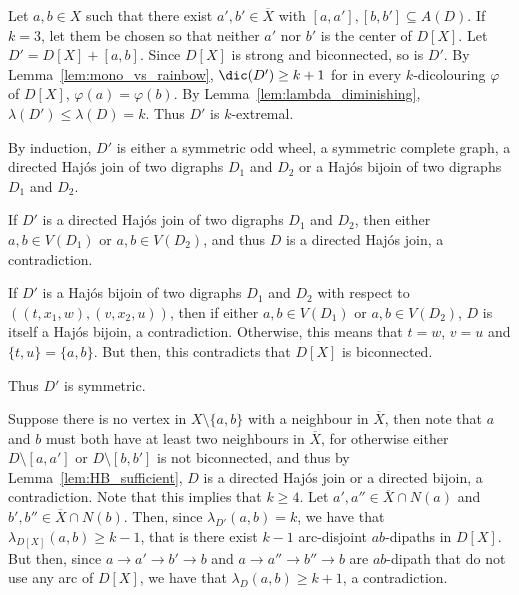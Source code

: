 


   

    Let $a, b \in X$ such that there exist $a',b' \in \overline{X}$ with $[a,a'], [b,b'] \subseteq A(D)$. If $k=3$, let them be chosen so that neither $a'$ nor $b'$ is the center of $D[X]$.
    Let $D' = D[X] + [a,b]$.
    Since $D[X]$ is strong and biconnected, so is $D'$.
    By Lemma~\ref{lem:mono_vs_rainbow}, $\dic(D') \geq k + 1$ for in every $k$-dicolouring $\varphi$ of $D[X]$, $\varphi(a) = \varphi(b)$.
    By Lemma~\ref{lem:lambda_diminishing}, $\lambda(D') \leq \lambda(D) = k$.
    Thus $D'$ is $k$-extremal.

    By induction, $D'$ is either a symmetric odd wheel, a symmetric complete graph, a directed Haj\'os join of two digraphs $D_1$ and $D_2$ or a Haj\'os bijoin of two digraphs $D_1$ and $D_2$.


    If $D'$ is a directed Haj\'os join of two digraphs $D_1$ and $D_2$, then either $a, b \in V(D_1)$ or $a, b \in V(D_2)$, and thus $D$ is a directed Haj\'os join, a contradiction.

    If $D'$ is a Haj\'os bijoin of two digraphs $D_1$ and $D_2$ with respect to $((t,x_1,w),(v,x_2,u))$, then if either $a, b \in V(D_1)$ or $a,b \in V(D_2)$, $D$ is itself a Haj\'os bijoin, a contradiction. Otherwise, this means that $t=w$, $v = u$ and $\{t,u\} = \{a,b\}$. But then, this contradicts that $D[X]$ is biconnected.

    Thus $D'$ is symmetric.

    Suppose there is no vertex in $X \setminus \{a,b\}$ with a neighbour in $\overline{X}$, then note that $a$ and $b$ must both have at least two neighbours in $\overline{X}$, for otherwise either $D \setminus [a,a']$ or $D \setminus [b,b']$ is not biconnected, and thus by Lemma~\ref{lem:HB_sufficient}, $D$ is a directed Haj\'os join or a directed bijoin, a contradiction. Note that this implies that $k \geq 4$. Let $a',a'' \in \overline{X} \cap N(a)$ and $b', b'' \in \overline{X} \cap N(b)$. Then, since $\lambda_{D'}(a,b) = k$, we have that $\lambda_{D[X]}(a,b) \geq k-1$, that is there exist $k-1$ arc-disjoint $ab$-dipaths in $D[X]$. But then, since $a \rightarrow a' \rightarrow b' \rightarrow b$ and $a \rightarrow a'' \rightarrow b'' \rightarrow b$ are $ab$-dipath that do not use any arc of $D[X]$, we have that $\lambda_{D}(a,b) \geq k + 1$, a contradiction.

